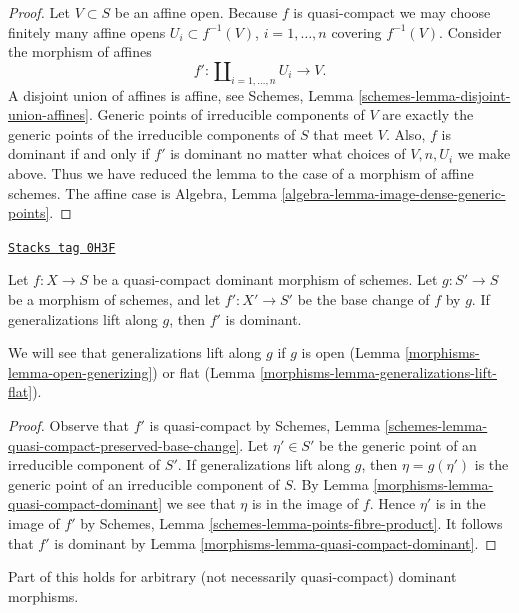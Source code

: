 \begin{proof}
Let $V \subset S$ be an affine open.
Because $f$ is quasi-compact we may choose finitely many affine
opens $U_i \subset f^{-1}(V)$, $i = 1, \ldots, n$ covering
$f^{-1}(V)$. Consider the morphism of affines
$$
f' :
\coprod\nolimits_{i = 1, \ldots, n} U_i
\longrightarrow
V.
$$
A disjoint union of affines is affine, see
Schemes, Lemma \ref{schemes-lemma-disjoint-union-affines}.
Generic points of irreducible components of $V$
are exactly the generic points of the irreducible components of
$S$ that meet $V$. Also, $f$ is dominant if and only if $f'$ is dominant
no matter what choices of $V, n, U_i$ we make above. Thus we
have reduced the lemma to the case of a morphism of affine schemes.
The affine case is
Algebra, Lemma \ref{algebra-lemma-image-dense-generic-points}.
\end{proof}

\begin{lemma}
\label{morphisms-lemma-base-change-dominant}
\href{https://stacks.math.columbia.edu/tag/0H3F}{\texttt{Stacks tag 0H3F}}

Let $f : X \to S$ be a quasi-compact dominant morphism of schemes.
Let $g : S' \to S$ be a morphism of schemes,  and let $f' : X' \to S'$
be the base change of $f$ by $g$. If generalizations lift along $g$,
then $f'$ is dominant.
\end{lemma}

We will see that generalizations lift along $g$ if $g$ is open
(Lemma \ref{morphisms-lemma-open-generizing})
or flat (Lemma \ref{morphisms-lemma-generalizations-lift-flat}).

\begin{proof}

Observe that $f'$ is quasi-compact by Schemes, Lemma
\ref{schemes-lemma-quasi-compact-preserved-base-change}.
Let $\eta' \in S'$ be the generic point of an irreducible
component of $S'$. If generalizations lift along $g$,
then $\eta = g(\eta')$ is the generic point of an irreducible
component of $S$. By Lemma \ref{morphisms-lemma-quasi-compact-dominant}
we see that $\eta$ is in the image of $f$.
Hence $\eta'$ is in the image of $f'$ by
Schemes, Lemma \ref{schemes-lemma-points-fibre-product}.
It follows that $f'$ is dominant by Lemma \ref{morphisms-lemma-quasi-compact-dominant}.
\end{proof}

Part of this holds for arbitrary (not necessarily quasi-compact)
dominant morphisms.

